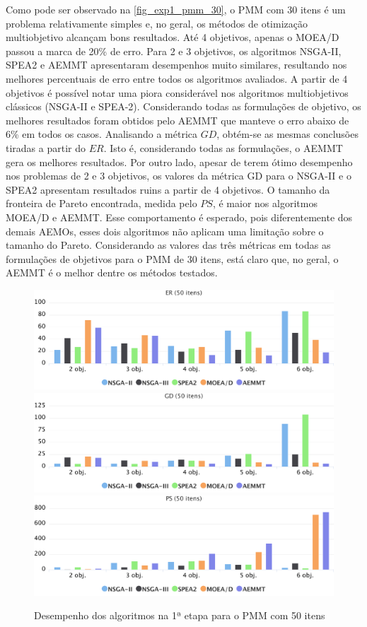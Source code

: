 Como pode ser observado na \autoref{fig_exp1_pmm_30}, o PMM com 30 itens é um problema relativamente simples e, no geral, os métodos de otimização multiobjetivo alcançam bons resultados. Até 4 objetivos, apenas o MOEA/D passou a marca de 20\% de erro. Para 2 e 3 objetivos, os algoritmos NSGA-II, SPEA2 e AEMMT apresentaram desempenhos muito similares, resultando nos melhores percentuais de erro entre todos os algoritmos avaliados. A partir de 4 objetivos é possível notar uma piora considerável nos algoritmos multiobjetivos clássicos (NSGA-II e SPEA-2). Considerando todas as formulações de objetivo, os melhores resultados foram obtidos pelo AEMMT que manteve o erro abaixo de 6\% em todos os casos. Analisando a métrica $GD$, obtém-se as mesmas conclusões tiradas a partir do $ER$. Isto é, considerando todas as formulações, o AEMMT gera os melhores resultados. Por outro lado, apesar de terem ótimo desempenho nos problemas de 2 e 3 objetivos, os valores da métrica GD para o NSGA-II e o SPEA2 apresentam resultados ruins a partir de 4 objetivos. O tamanho da fronteira de Pareto encontrada, medida pelo $PS$, é maior nos algoritmos MOEA/D e AEMMT. Esse comportamento é esperado, pois diferentemente dos demais AEMOs, esses dois algoritmos não aplicam uma limitação sobre o tamanho do Pareto. Considerando as valores das três métricas em todas as formulações de objetivos para o PMM de 30 itens, está claro que, no geral, o AEMMT é o melhor dentre os métodos testados.

\begin{figure}[!htbp]
	\includegraphics[width=1\textwidth]{cap_experimentos/figs/etapa1/er-mkp-50}
	\includegraphics[width=1\textwidth]{cap_experimentos/figs/etapa1/gd-mkp-50}
	\includegraphics[width=1\textwidth]{cap_experimentos/figs/etapa1/ps-mkp-50}
	\caption{\label{fig_exp1_pmm_50}Desempenho dos algoritmos na 1ª etapa para o PMM com 50 itens}
\end{figure}

